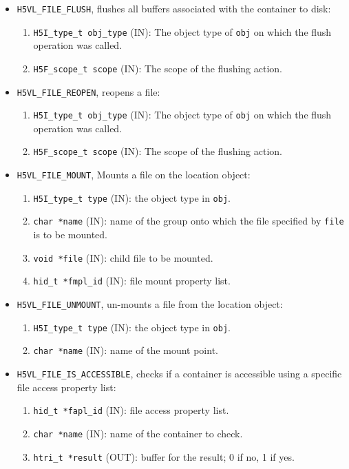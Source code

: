 \begin{mdframed}[style=bgbox]
\begin{itemize}
\item \texttt{H5VL\_FILE\_FLUSH}, flushes all buffers associated with the container to disk:
  \begin{enumerate}
  \item \texttt{H5I\_type\_t obj\_type} (IN): The object type of \texttt{obj} on which the flush operation was called.
  \item \texttt{H5F\_scope\_t scope} (IN): The scope of the flushing action.
  \end{enumerate}
  
\item \texttt{H5VL\_FILE\_REOPEN}, reopens a file:
  \begin{enumerate}
  \item \texttt{H5I\_type\_t obj\_type} (IN): The object type of \texttt{obj} on which the flush operation was called.
  \item \texttt{H5F\_scope\_t scope} (IN): The scope of the flushing action.
  \end{enumerate}
  
\item \texttt{H5VL\_FILE\_MOUNT}, Mounts a file on the location object:
  \begin{enumerate}
  \item \texttt{H5I\_type\_t type} (IN): the object type in \texttt{obj}.
  \item \texttt{char *name} (IN): name of the group onto which the file
    specified by \texttt{file} is to be mounted.
  \item \texttt{void *file} (IN): child file to be mounted.
  \item \texttt{hid\_t *fmpl\_id} (IN): file mount property list.
  \end{enumerate}

\item \texttt{H5VL\_FILE\_UNMOUNT}, un-mounts a file from the location object:
  \begin{enumerate}
  \item \texttt{H5I\_type\_t type} (IN): the object type in \texttt{obj}.
  \item \texttt{char *name} (IN): name of the mount point.
  \end{enumerate}

\item \texttt{H5VL\_FILE\_IS\_ACCESSIBLE}, checks if a container is
  accessible using a specific file access property list:
  \begin{enumerate}
  \item \texttt{hid\_t *fapl\_id} (IN): file access property list.
  \item \texttt{char *name} (IN): name of the container to check.
  \item \texttt{htri\_t *result} (OUT): buffer for the result; 0 if no, 1
    if yes.
  \end{enumerate}


\end{itemize}
\end{mdframed}
